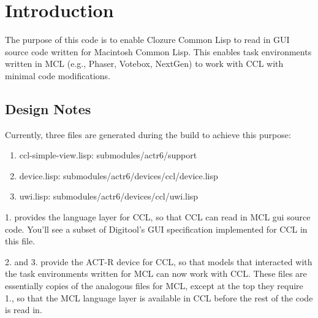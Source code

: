 \documentclass[12pt]{article} %
\begin{document}

\tableofcontents %

\newpage %


\section{Introduction} %

The purpose of this code is to enable Clozure Common Lisp to read in GUI source code written for Macintosh Common Lisp.
This enables task environments written in MCL (e.g., Phaser, Votebox, NextGen) to work with CCL with minimal code modifications. 

\subsection{Design Notes}

Currently, three files are generated during the build to achieve this purpose:

\begin{enumerate}[topsep=12pt]
    \item ccl-simple-view.lisp: submodules/actr6/support
    \item device.lisp: submodules/actr6/devices/ccl/device.lisp
    \item uwi.lisp: submodules/actr6/devices/ccl/uwi.lisp
\end{enumerate}

1. provides the language layer for CCL, so that CCL can read in MCL gui source code.
You'll see a subset of Digitool's GUI specification implemented for CCL in this file.

2. and 3. provide the ACT-R device for CCL, so that models that interacted with the task environments written for MCL can now work with CCL.
These files are essentially copies of the analogous files for MCL, except at the top they require 1., so that the MCL language layer is available in CCL before the rest of the code is read in.
\end{document}
